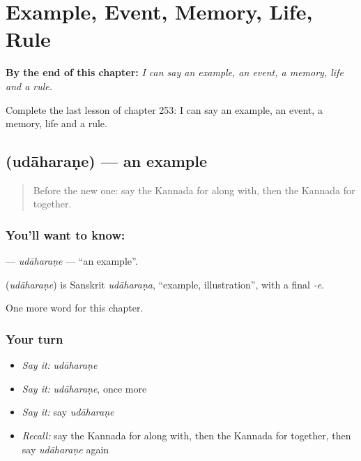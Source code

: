 
\chapter{Example, Event, Memory, Life, Rule}
\label{ch:ka-example-event-memory-life-rule}

\begin{chapteropening}
\textbf{By the end of this chapter:} \emph{I can say an example, an event, a memory, life and a rule.}

Complete the last lesson of chapter 253: I can say an example, an event, a memory, life and a rule.
\end{chapteropening}

\section[\texorpdfstring{\kn{ಉದಾಹರಣೆ} (udāharaṇe)}{ಉದಾಹರಣೆ (udāharaṇe)}]{ (udāharaṇe) — an example}

\label{lesson:KA-C253-udaharane}



\begin{quote}
Before the new one: say the Kannada for along with, then the Kannada for together.
\end{quote}

\subsection*{You'll want to know: }
\textbf{} — \emph{udāharaṇe} — \textquotedblleft{}an example\textquotedblright{}.

\begin{cousinweb}
\textbf{} (\emph{udāharaṇe}) is Sanskrit \emph{udāharaṇa}, \textquotedblleft{}example, illustration\textquotedblright{}, with a final \emph{-e}.
\end{cousinweb}

\begin{grammarlens}[title={What you've built}]
One more word for this chapter.
\end{grammarlens}

\subsection*{Your turn}
\begin{itemize}
\raggedright
  \item \emph{Say it:} \emph{udāharaṇe}
  \item \emph{Say it:} \emph{udāharaṇe}, once more
  \item \emph{Say it:} say \emph{udāharaṇe}
  \item \emph{Recall:} say the Kannada for along with, then the Kannada for together, then say \emph{udāharaṇe} again
\end{itemize}


